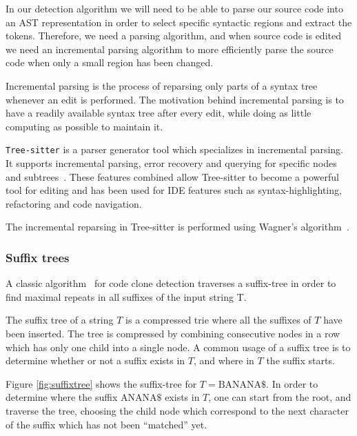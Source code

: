 In our detection algorithm we will need to be able to parse our source code into an AST
representation in order to select specific syntactic regions and extract the tokens.
Therefore, we need a parsing algorithm, and when source code is edited we need an
incremental parsing algorithm to more efficiently parse the source code when only a
small region has been changed.

Incremental parsing is the process of reparsing only parts of a syntax tree whenever an
edit is performed. The motivation behind incremental parsing is to have a readily
available syntax tree after every edit, while doing as little computing as possible to
maintain it.

\verb|Tree-sitter| is a parser generator tool which specializes in incremental parsing. It
supports incremental parsing, error recovery and querying for specific nodes and
subtrees~\cite{treesitter}. These features combined allow Tree-sitter to become a powerful
tool for editing and has been used for IDE features such as syntax-highlighting,
refactoring and code navigation.

The incremental reparsing in Tree-sitter is performed using Wagner's
algorithm~\cite{PracticalAlgorithmsForIncremental}.


\subsubsection{Suffix trees}

A classic algorithm~\cite{Zibran_real_time_search, GodeIncrementalCloneDetection} for code
clone detection traverses a suffix-tree in order to find maximal repeats in all suffixes
of the input string T.

The suffix tree of a string $T$ is a compressed trie where all the suffixes of $T$ have been
inserted. The tree is compressed by combining consecutive nodes in a row which has
only one child into a single node. A common usage of a suffix tree is to determine whether
or not a suffix exists in $T$, and where in $T$ the suffix starts.

Figure \ref{fig:suffixtree} shows the suffix-tree for $T=\text{BANANA\$}$. In order to
determine where the suffix $\text{ANANA\$}$ exists in $T$, one can start from the root,
and traverse the tree, choosing the child node which correspond to the next character of
the suffix which has not been ``matched'' yet.

